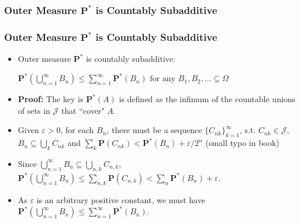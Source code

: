 \documentclass[%
]{beamer}
\newcommand{\BP}{\mathbf{P}}
\begin{document}
\subsubsection{Outer Measure $\BP^*$ is Countably Subadditive}
\frame
{
  \frametitle{Outer Measure $\BP^*$ is Countably Subadditive}

   \begin{itemize}

            \item<1->   [] \begin{Lemma}[2.3.6.] Outer measure $\BP^*$ is countably subadditive:  
            
            $\BP^*(\bigcup_{n=1}^{\infty} B_n)\leq \sum_{n=1}^{\infty} \BP^* (B_n) \text{ for any }B_1, B_2,\ldots \subseteq \Omega$
               \end{Lemma}    
       
              \item<2-> []\textbf{Proof:} The key is $\BP^* (A)$ is defined as the infimum of the countable unions of sets in $\mathcal{J}$ that ``cover" $A$.
             \item<3-> [1)] Given $\varepsilon>0$, for each $B_n$, there must be a sequence $\{C_{nk}\}_{k=1}^{\infty}$, s.t. $C_{nk}\in \mathcal{J}$, $B_n \subseteq \bigcup_k  C_{nk}$ and $\sum_k \BP(C_{nk}) < \BP^* (B_n)+\varepsilon/2^n$ (small typo in book)
               \item<4-> [2)] Since $\bigcup_{n=1}^{\infty} B_n \subseteq \bigcup_{n, k} C_{n,k}$, $\BP^*(\bigcup_{n=1}^{\infty} B_n) \leq \sum_{n, k} \BP(C_{n,k}) <  \sum_n \BP^* (B_n)+\varepsilon$. 
                \item<4-> [3)] As $\varepsilon$ is an arbitrary positive constant, we must have $\BP^*(\bigcup_{n=1}^{\infty} B_n)\leq \sum_{n=1}^{\infty} \BP^* (B_n) $.
    
                 \end{itemize}
}
\end{document}
